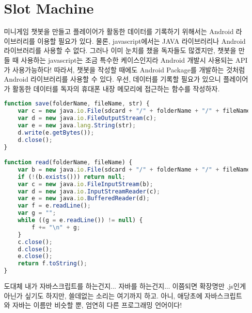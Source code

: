 \documentclass[10pt,a4paper,final]{book}
\begin{document}
\section{Slot Machine}
미니게임 챗봇을 만들고 플레이어가 활동한 데이터를 기록하기 위해서는 Android 라이브러리를
이용할 필요가 있다. 물론, javascript에서는 JAVA 라이브러리나 Android 라이브러리를 사용할 수 없다.
그러나 이미 눈치를 챘을 독자들도 많겠지만, 챗봇을 만들 때 사용하는 javascript는 조금 특수한 케이스인지라
Android 개발시 사용되는 API가 사용가능하다! 따라서, 챗봇을 작성할 때에도 Android Package를 개발하는 것처럼
Android 라이브러리를 사용할 수 있다.
우선, 데이터를 기록할 필요가 있으니 플레이어가 활동한 데이터를 독자의 휴대폰 내장 메모리에 접근하는 함수를 작성하자.
\begin{lstlisting}[language=JavaScript,escapeinside=@@]
function save(folderName, fileName, str) {
    var c = new java.io.File(sdcard + "/" + folderName + "/" + fileName);
    var d = new java.io.FileOutputStream(c);
    var e = new java.lang.String(str);
    d.write(e.getBytes());
    d.close();
}

function read(folderName, fileName) {
    var b = new java.io.File(sdcard + "/" + folderName + "/" + fileName);
    if (!(b.exists())) return null;
    var c = new java.io.FileInputStream(b);
    var d = new java.io.InputStreamReader(c);
    var e = new java.io.BufferedReader(d);
    var f = e.readLine();
    var g = "";
    while ((g = e.readLine()) != null) {
        f += "\n" + g;
    }
    c.close();
    d.close();
    e.close();
    return f.toString();
}
\end{lstlisting}
도대체 내가 자바스크립트를 하는건지... 자바를 하는건지... 이쯤되면 확장명만 .js인게 아닌가 싶기도 하지만,
쓸데없는 소리는 여기까지 하고. 아니, 애당초에 자바스크립트와 자바는 이름만 비슷할 뿐, 엄연히 다른 프로그래밍 언어이다!
\end{document}

